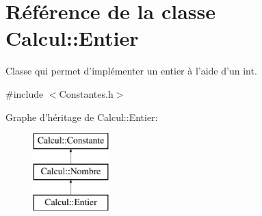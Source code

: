 \hypertarget{class_calcul_1_1_entier}{\section{Référence de la classe Calcul\-:\-:Entier}
\label{class_calcul_1_1_entier}
}


Classe qui permet d'implémenter un entier à l'aide d'un int.  




{\ttfamily \#include $<$Constantes.\-h$>$}

Graphe d'héritage de Calcul\-:\-:Entier\-:\begin{figure}[H]
\begin{center}
\leavevmode
\includegraphics[height=3.000000cm]{class_calcul_1_1_entier}
\end{center}
\end{figure}
